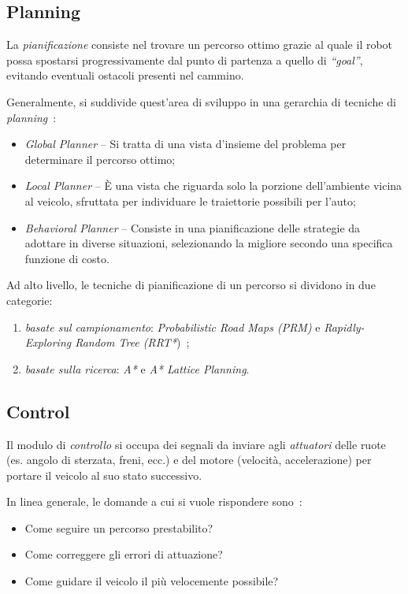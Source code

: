 \subsection{Planning}
\label{subs:planning}
La \textit{pianificazione} consiste nel trovare un percorso ottimo grazie al quale il robot 
possa spostarsi progressivamente dal punto di partenza a quello di \textit{``goal''},
evitando eventuali ostacoli presenti nel cammino.

Generalmente, si suddivide quest'area di sviluppo in una gerarchia di tecniche di \textit{planning}~\cite{f1tenthcoursel12}:
\begin{itemize}
    \item \textit{Global Planner} -- Si tratta di una vista d’insieme del problema per determinare il percorso ottimo;
    \item \textit{Local Planner} -- È una vista che riguarda solo la porzione dell'ambiente 
    vicina al veicolo, sfruttata per individuare le traiettorie possibili per l'auto;
    \item \textit{Behavioral Planner} -- Consiste in una pianificazione delle strategie da 
    adottare in diverse situazioni, selezionando la migliore secondo una specifica funzione di costo.
\end{itemize}

Ad alto livello, le tecniche di pianificazione di un percorso si dividono in due categorie:
\begin{enumerate}
    \item \textit{basate sul campionamento}: \textit{Probabilistic Road Maps (PRM)} e \textit{Rapidly-Exploring Random Tree (RRT*})~\cite{samplingbased};
    \item \textit{basate sulla ricerca}: \textit{A*} e \textit{A* Lattice Planning}.
\end{enumerate}

\subsection{Control}
\label{subs:control}
Il modulo di \textit{controllo} si occupa dei segnali da inviare agli \textit{attuatori} delle 
ruote (es. angolo di sterzata, freni, ecc.) e del motore (velocità, accelerazione) per portare 
il veicolo al suo stato successivo.

In linea generale, le domande a cui si vuole rispondere sono~\cite{f1tenthcoursel10}:
\begin{itemize}
    \item Come seguire un percorso prestabilito?
    \item Come correggere gli errori di attuazione?
    \item Come guidare il veicolo il più velocemente possibile?
\end{itemize}

